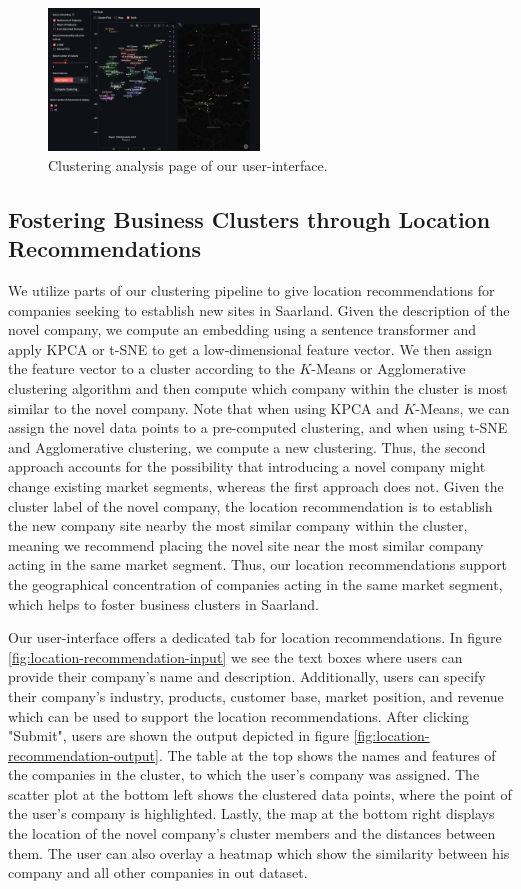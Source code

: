 \documentclass[conference]{IEEEtran}
\begin{document}
\begin{figure}[H]
	\centering
	\includegraphics[width=0.5\textwidth]{figures/clustering_analysis.png}
	\caption{Clustering analysis page of our user-interface.}
	\label{fig:clustering-analysis}
\end{figure}

\subsection{Fostering Business Clusters through Location Recommendations}
We utilize parts of our clustering pipeline to give location recommendations for companies seeking to establish new sites in Saarland. Given the description of the novel company, we compute an embedding using a sentence transformer and apply KPCA or t-SNE to get a low-dimensional feature vector. We then assign the feature vector to a cluster according to the $K$-Means or Agglomerative clustering algorithm and then compute which company within the cluster is most similar to the novel company. Note that when using KPCA and $K$-Means, we can assign the novel data points to a pre-computed clustering, and when using t-SNE and Agglomerative clustering, we compute a new clustering.
Thus, the second approach accounts for the possibility that introducing a novel company might change existing market segments, whereas the first approach does not.
Given the cluster label of the novel company, the location recommendation is to establish the new company site nearby the most similar company within the cluster, meaning we recommend placing the novel site near the most similar company acting in the same market segment. Thus, our location recommendations support the geographical concentration of companies acting in the same market segment, which helps to foster business clusters in Saarland.

Our user-interface offers a dedicated tab for location recommendations. In figure \ref{fig:location-recommendation-input} we see the text boxes where users can provide their company's name and description. Additionally, users can specify their company's industry, products, customer base, market position, and revenue which can be used to support the location recommendations. After clicking "Submit", users are shown the output depicted in figure \ref{fig:location-recommendation-output}. The table at the top shows the names and features of the companies in the cluster, to which the user's company was assigned. The scatter plot at the bottom left shows the clustered data points, where the point of the user's company is highlighted. Lastly, the map at the bottom right displays the location of the novel company's cluster members and the distances between them. The user can also overlay a heatmap which show the similarity between his company and all other companies in out dataset.
\end{document}

